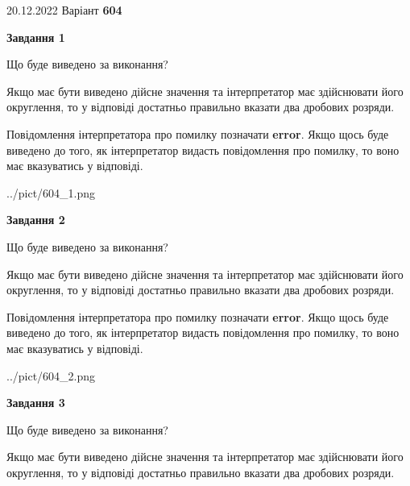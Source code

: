 \documentclass[12pt, ukrainian]{article}
\begin{document}
{20.12.2022 Варіант \No \textbf { 604 }\par}
{
\begin {Large}

{\begin {center}\textbf{Завдання 1}\end {center}}\par
Що буде виведено за виконання? \par

Якщо має бути виведено дійсне значення та інтерпретатор має здійснювати його округлення, 
то у відповіді достатньо правильно вказати два дробових розряди.

Повідомлення інтерпретатора про помилку позначати \textbf{error}.
Якщо щось буде виведено до того, як інтерпретатор видасть повідомлення про помилку, 
то воно має вказуватись у відповіді. \par

\begin{center}
	{../pict/604_1.png}
\end{center}
\newpage

{\begin {center}\textbf{Завдання 2}\end {center}}\par
Що буде виведено за виконання? \par

Якщо має бути виведено дійсне значення та інтерпретатор має здійснювати його округлення, 
то у відповіді достатньо правильно вказати два дробових розряди.

Повідомлення інтерпретатора про помилку позначати \textbf{error}.
Якщо щось буде виведено до того, як інтерпретатор видасть повідомлення про помилку, 
то воно має вказуватись у відповіді. \par

\begin{center}
	{../pict/604_2.png}
\end{center}
\newpage

{\begin {center}\textbf{Завдання 3}\end {center}}\par
Що буде виведено за виконання? \par

Якщо має бути виведено дійсне значення та інтерпретатор має здійснювати його округлення, 
то у відповіді достатньо правильно вказати два дробових розряди.


\end{Large}}
\end{document}
